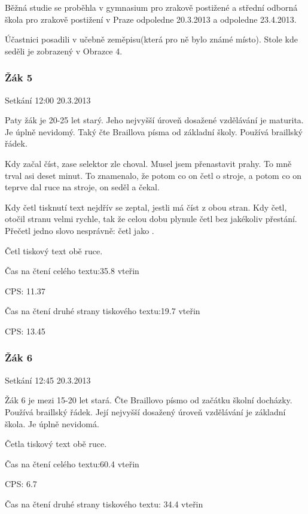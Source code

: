 Běžná studie se proběhla v gymnasium pro zrakově postižené a střední odborná škola pro zrakově postižení v Praze odpoledne 20.3.2013 a odpoledne 23.4.2013.

Účastnici posadili v učebně zeměpisu(která pro ně bylo známé místo).  Stole kde seděli je zobrazený v Obrazce 4.

\subsubsection{Žák 5}
Setkání 12:00 20.3.2013

Paty žák je 20-25 let starý.  Jeho nejvyšší úroveň dosažené vzdělávání je maturita. Je úplně nevidomý.  Taký čte Braillova písma od základní školy.  Používá braillský řádek.

Kdy začal číst, zase selektor zle choval.  Musel jsem přenastavit prahy.  To mně trval asi deset minut.  To znamenalo, že potom co on četl o stroje, a potom co on teprve dal ruce na stroje, on seděl a čekal.

Kdy četl tisknutí text nejdřív se zeptal, jestli má číst z obou stran.  Kdy četl, otočil stranu velmi rychle, tak že celou dobu plynule četl bez jakékoliv přestání.  Přečetl jedno slovo nesprávně: četl  jako .

Četl tiskový text obě ruce.


Čas na čtení celého textu:35.8 vteřin

CPS: 11.37

Čas na čtení druhé strany tiskového textu:19.7 vteřin

CPS: 13.45

\subsubsection{Žák 6}
Setkání 12:45 20.3.2013

Žák 6 je mezi 15-20 let stará. Čte Braillovo písmo od začátku školní docházky. Používá braillský řádek. Její nejvyšší dosažený úroveň vzdělávání je základní škola.  Je úplně nevidomá.

Četla tiskový text obě ruce.


Čas na čtení celého textu:60.4 vteřin

CPS: 6.7

Čas na čtení druhé strany tiskového textu: 34.4 vteřin


